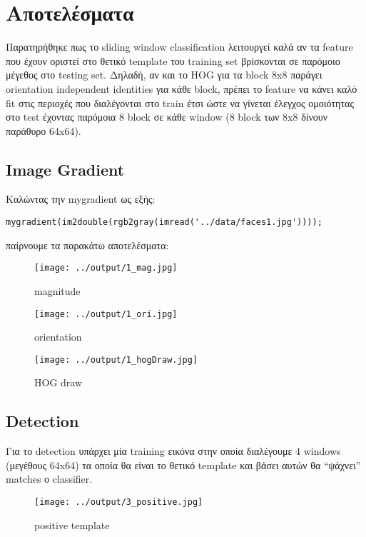 \documentclass[11pt]{scrartcl} %
\begin{document}
\section{Αποτελέσματα}
Παρατηρήθηκε πως το sliding window classification λειτουργεί καλά αν τα feature που έχουν οριστεί
στο θετικό template του training set βρίσκονται σε παρόμοιο μέγεθος στο testing set. Δηλαδή, αν
και το HOG για τα block 8x8 παράγει orientation independent identities για κάθε block, πρέπει το
feature να κάνει καλό fit στις περιοχές που διαλέγονται στο train έτσι ώστε να γίνεται έλεγχος
ομοιότητας στο test έχοντας παρόμοια 8 block σε κάθε window (8 block των 8x8 δίνουν παράθυρο 64x64).

\subsection{Image Gradient}

Καλώντας την mygradient ως εξής:

\begin{verbatim}
mygradient(im2double(rgb2gray(imread('../data/faces1.jpg'))));
\end{verbatim}

παίρνουμε τα παρακάτω αποτελέσματα:

\begin{figure}[H]
  \texttt{[image: ../output/1\_mag.jpg]}
  \caption{magnitude}
\end{figure}

\begin{figure}[H]
  \texttt{[image: ../output/1\_ori.jpg]}
  \caption{orientation}
\end{figure}

\begin{figure}[H]
  \texttt{[image: ../output/1\_hogDraw.jpg]}
  \caption{HOG draw}
\end{figure}

\subsection{Detection}
Για το detection υπάρχει μία training εικόνα στην οποία διαλέγουμε 4 windows (μεγέθους
64x64) τα οποία θα είναι το θετικό template και βάσει αυτών θα ``ψάχνει'' matches
ο classifier.

\begin{figure}[H]
  \texttt{[image: ../output/3\_positive.jpg]}
  \caption{positive template}
\end{figure}
\end{document}
